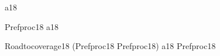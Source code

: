 \begin{circus}
\circchannel a18 \\
\end {circus}
\begin {circus}
\circprocess Prefproc18 \circdef \circbegin
	\circspot
	    a18 \then \Skip \\
	\circend
\end{circus}
\begin{circus}
\circprocess Roadtocoverage18 \circdef (Prefproc18 \interleave Prefproc18) \lpar \lchanset a18 \rchanset \rpar Prefproc18 \\
\end{circus}
